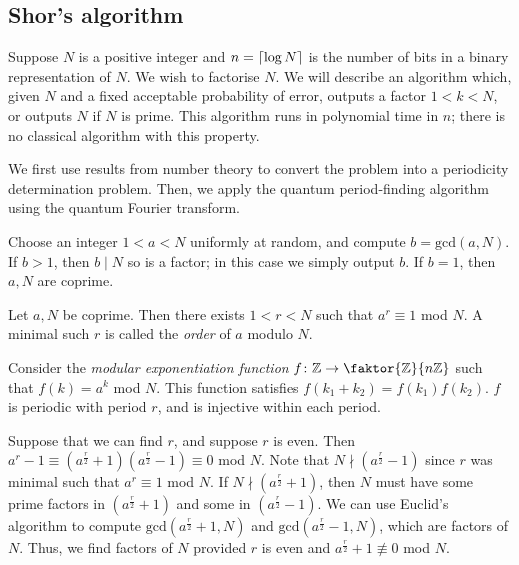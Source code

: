 \subsection{Shor's algorithm}
Suppose \( N \) is a positive integer and \( n = \lceil\log N\rceil \) is the number of bits in a binary representation of \( N \).
We wish to factorise \( N \).
We will describe an algorithm which, given \( N \) and a fixed acceptable probability of error, outputs a factor \( 1 < k < N \), or outputs \( N \) if \( N \) is prime.
This algorithm runs in polynomial time in \( n \); there is no classical algorithm with this property.

We first use results from number theory to convert the problem into a periodicity determination problem.
Then, we apply the quantum period-finding algorithm using the quantum Fourier transform.

Choose an integer \( 1 < a < N \) uniformly at random, and compute \( b = \mathrm{gcd}(a,N) \).
If \( b > 1 \), then \( b \mid N \) so is a factor; in this case we simply output \( b \).
If \( b = 1 \), then \( a, N \) are coprime.
\begin{theorem}
    Let \( a, N \) be coprime.
    Then there exists \( 1 < r < N \) such that \( a^r \equiv 1 \) mod \( N \).
    A minimal such \( r \) is called the \emph{order} of \( a \) modulo \( N \).
\end{theorem}
Consider the \emph{modular exponentiation function} \( f \colon \mathbb Z \to \faktor{\mathbb Z}{n\mathbb Z} \) such that \( f(k) = a^k \) mod \( N \).
This function satisfies \( f(k_1 + k_2) = f(k_1)f(k_2) \).
\( f \) is periodic with period \( r \), and is injective within each period.

Suppose that we can find \( r \), and suppose \( r \) is even.
Then \( a^r - 1 \equiv (a^{\frac{r}{2}}+1)(a^{\frac{r}{2}}-1) \equiv 0 \) mod \( N \).
Note that \( N \nmid (a^{\frac{r}{2}}-1) \) since \( r \) was minimal such that \( a^r \equiv 1 \) mod \( N \).
If \( N \nmid (a^{\frac{r}{2}}+1) \), then \( N \) must have some prime factors in \( (a^{\frac{r}{2}}+1) \) and some in \( (a^{\frac{r}{2}}-1) \).
We can use Euclid's algorithm to compute \( \mathrm{gcd}(a^{\frac{r}{2}}+1, N) \) and \( \mathrm{gcd}(a^{\frac{r}{2}}-1, N) \), which are factors of \( N \).
Thus, we find factors of \( N \) provided \( r \) is even and \( a^{\frac{r}{2}} + 1 \not\equiv 0 \) mod \( N \).

